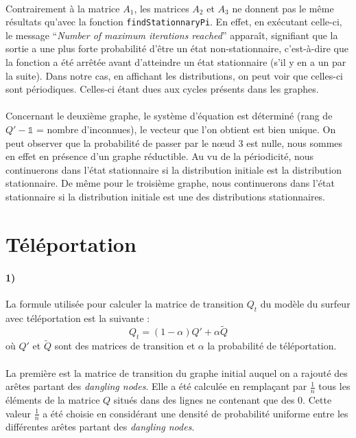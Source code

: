 \documentclass[a4paper,titlepage]{report}
\begin{document}
\paragraph{}
Contrairement à la matrice $A_1$, les matrices $A_2$ et $A_3$ ne donnent pas le même résultats qu'avec la fonction \texttt{findStationnaryPi}. En effet, en exécutant celle-ci, le message ``\textit{Number of maximum iterations reached}'' apparaît, signifiant que la sortie a une plus forte probabilité d'être un état non-stationnaire, c'est-à-dire que la fonction a été arrêtée avant d'atteindre un état stationnaire (s'il y en a un par la suite). Dans notre cas, en affichant les distributions, on peut voir que celles-ci sont périodiques. Celles-ci étant dues aux cycles présents dans les graphes.
\paragraph{}
Concernant le deuxième graphe, le système d'équation est déterminé (rang de $Q' - \mathbb{1}$ = nombre d'inconnues), le vecteur que l'on obtient est bien unique. On peut observer que la probabilité de passer par le nœud 3 est nulle, nous sommes en effet en présence d'un graphe réductible. Au vu de la périodicité, nous continuerons dans l'état stationnaire si la distribution initiale est la distribution stationnaire. De même pour le troisième graphe, nous continuerons dans l'état stationnaire si la distribution initiale est une des distributions stationnaires.

\section{Téléportation}
\label{sec:teleport}
\paragraph{1)}
La formule utilisée pour calculer la matrice de transition $Q_t$ du modèle du surfeur avec téléportation est la suivante :
\[
	Q_t = (1 - \alpha) Q' + \alpha \tilde{Q}
\]
où $Q'$ et $\tilde{Q}$ sont des matrices de transition et $\alpha$ la probabilité de téléportation. 
\paragraph{}
La première est la matrice de transition du graphe initial auquel on a rajouté des arêtes partant des \textit{dangling nodes}. Elle a été calculée en remplaçant par $\frac{1}{n}$ tous les éléments de la matrice $Q$ situés dans des lignes ne contenant que des 0. Cette valeur $\frac{1}{n}$ a été choisie en considérant une densité de probabilité uniforme entre les différentes arêtes partant des \textit{dangling nodes}. 
\end{document}
